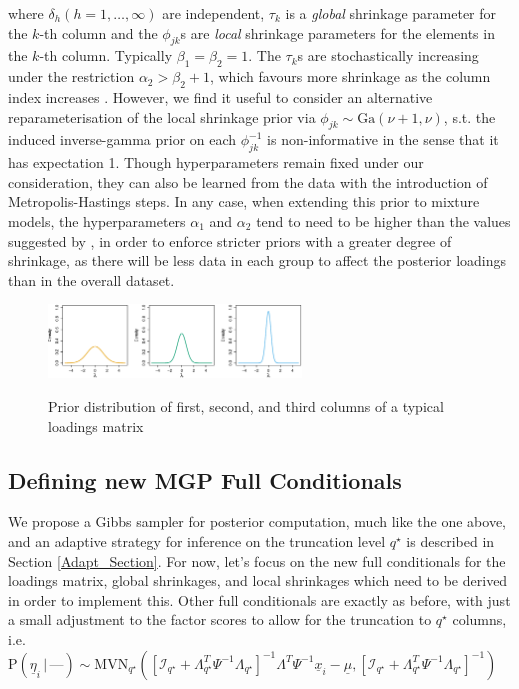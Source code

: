 \documentclass[a4paper,12pt,fleqn]{article}
\numberwithin{equation}{section}
\def\given{\,|\,}
\begin{document}
\noindent where $\delta_h \left(h=1,\ldots,\infty\right)$ are independent, $\tau_k$ is a \textit{global} shrinkage parameter for the $k$-th column and the $\phi_{jk}$s are \textit{local} shrinkage parameters for the elements in the $k$-th column. Typically $\beta_1 = \beta_2 = 1$. The $\tau_k$s are stochastically increasing under the restriction $\alpha_2 > \beta_2 + 1$, which favours more shrinkage as the column index increases \citep{Durante2016}. However, we find it useful to consider an alternative reparameterisation of the local shrinkage prior via $\phi_{jk}\sim\textrm{Ga}\left(\nu + 1, \nu\right)$, s.t. the induced inverse-gamma prior on each $\phi_{jk}^{-1}$ is non-informative in the sense that it has expectation 1. Though hyperparameters remain fixed under our consideration, they can also be learned from the data with the introduction of Metropolis-Hastings steps. In any case, when extending this prior to mixture models, the hyperparameters $\alpha_1$ and $\alpha_2$ tend to need to be higher than the values suggested by \citet{Bhattacharya2011}, in order to enforce stricter priors with a greater degree of shrinkage, as there will be less data in each group to affect the posterior loadings than in the overall dataset.

\begin{figure}[h]
	\centering
	\caption{Prior distribution of first, second, and third columns of a typical loadings matrix}
	\includegraphics[width=0.6\textwidth, keepaspectratio]{Priors}
	\label{PriorPlot}
\end{figure}

\subsection[Defining new MGP Full Conditionals]{Defining new MGP Full Conditionals}
We propose a Gibbs sampler for posterior computation, much like the one above, and an adaptive strategy for inference on the truncation level $q^\star$ is described in Section \ref{Adapt_Section}. For now, let's focus on the new full conditionals for the loadings matrix, global shrinkages, and local shrinkages which need to be derived in order to implement this. Other full conditionals are exactly as before, with just a small adjustment to the factor scores to allow for the truncation to $q^\star$ columns, i.e. $\mathrm{P}\left(\underline{\eta}_i \given \mbox{---}\right) \sim  \textrm{MVN}_{q^\star}\left(\left[\mathcal{I}_{q^\star} + \Lambda^T_{q^\star}\Psi^{-1}\Lambda_{q^\star}\right]^{-1}\Lambda^T\Psi^{-1}\underline{x}_i - \underline{\mu},\left[\mathcal{I}_{q^\star} + \Lambda^T_{q^\star}\Psi^{-1}\Lambda_{q^\star}\right]^{-1}\right)$
\end{document}
